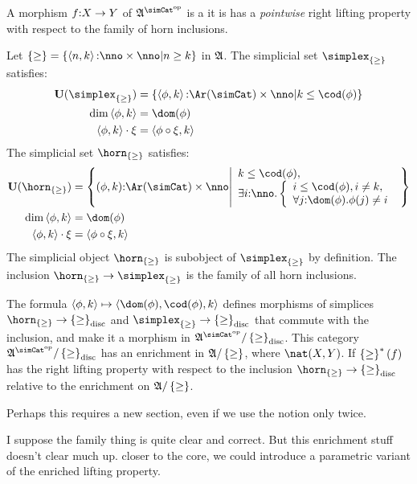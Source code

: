 \documentclass[csh.tex]{subfiles}
\begin{document}
\begin{definition} A morphism $f\mathord : X\to Y$ of $\ambient\s$ is a  it is has a \emph{pointwise} right lifting property with respect to the family of horn inclusions.

Let $\set\geq = \set{\tuplet{n,k}\of \nno\times\nno |n\geq k}$ in $\mathfrak A$.
The simplicial set $\simplex_{\set\geq}$ satisfies:
\begin{align*}
\base(\simplex_{\set\geq}) &= \set{\tuplet{\phi,k}\of\Ar(\simCat)\times\nno| k\leq \cod(\phi) } \\
\dim\tuplet{\phi,k} &= \dom(\phi) \\
\tuplet{\phi,k}\cdot \xi &= \tuplet{\phi\circ\xi,k}
\end{align*}
The simplicial set $\horn_{\set\geq}$ satisfies:
\begin{align*}
\base(\horn_{\set\geq}) &= \set{(\phi,k)\of\Ar(\simCat)\times\nno\middle| 
\begin{array}{l}
k\leq \cod(\phi),\\
\exists i\of\nno.\left\{\begin{array}{l}i\leq \cod(\phi), i\neq k,\\ \forall j\of \dom(\phi).\phi(j)\neq i \end{array}\right. 
\end{array}
} \\
\dim\tuplet{\phi,k} &= \dom(\phi) \\
\tuplet{\phi,k}\cdot \xi &= \tuplet{\phi\circ\xi,k}
\end{align*}
The simplicial object $\horn_{\set\geq}$ is subobject of $\simplex_{\set\geq}$ by definition. 
The inclusion $\horn_{\set\geq}\to\simplex_{\set\geq}$ is the family of all horn inclusions.

The formula $\tuplet{\phi,k}\mapsto \tuplet{\dom(\phi),\cod(\phi),k}$ defines morphisms of simplices $\horn_{\set\geq}\to\set\geq\disc$ and $\simplex_{\set\geq}\to\set\geq\disc$ that commute with the inclusion, and make it a morphism in $\ambient\s/\set\geq\disc$. This category $\ambient\s/\set\geq\disc$ has an enrichment in $\mathfrak A/\left\{\geq\right\}$, where $\nat(X,Y)$. If $\left\{\geq\right\}^*(f)$ has the right lifting property with respect to the inclusion $\horn_{\set\geq}\to\set\geq\disc$ relative to the enrichment on $\mathfrak A/\left\{\geq\right\}$.
\end{definition}

Perhaps this requires a new section, even if we use the notion only twice.

I suppose the family thing is quite clear and correct. But this enrichment stuff doesn't clear much up.
closer to the core, we could introduce a parametric variant of the enriched lifting property.
\end{document}
